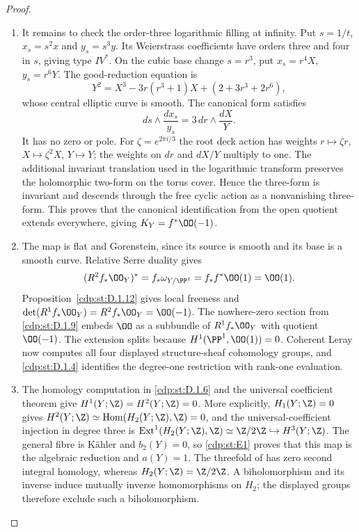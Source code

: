 \begin{proof}
\begin{enumerate}[label={$\langle1\rangle$\arabic*.},leftmargin=*]
\item It remains to check the order-three logarithmic filling at infinity.
Put $s=1/t$, $x_s=s^2x$ and $y_s=s^3y$. Its Weierstrass
coefficients have orders three and four in $s$, giving type $IV^*$.
On the cubic base change $s=r^3$, put
$x_s=r^4X$, $y_s=r^6Y$. The good-reduction equation is
\[
Y^2=X^3-3r(r^3+1)X+(2+3r^3+2r^6),
\]
whose central elliptic curve is smooth. The canonical form satisfies
\[
ds\wedge\frac{dx_s}{y_s}
=3\,dr\wedge\frac{dX}{Y}.
\]
It has no zero or pole. For $\zeta=e^{2\pi i/3}$ the root deck
action has weights $r\mapsto\zeta r$, $X\mapsto\zeta^2X$,
$Y\mapsto Y$; the weights on $dr$ and $dX/Y$ multiply to one.
The additional invariant translation used in the logarithmic
transform preserves the holomorphic two-form on the torus cover.
Hence the three-form is invariant and descends through the free
cyclic action as a nonvanishing three-form. This proves that the
canonical identification from the open quotient extends everywhere,
giving $K_Y=f^*\OO(-1)$.

\item The map is flat and Gorenstein, since its source is smooth and its
base is a smooth curve. Relative Serre duality gives
\[
(R^2f_*\OO_Y)^*=f_*\omega_{Y/\PP^1}
=f_*f^*\OO(1)=\OO(1).
\]
Proposition~\ref{cdp:st:D.1.12} gives local freeness and
$\det(R^1f_*\OO_Y)=R^2f_*\OO_Y=\OO(-1)$.
The nowhere-zero section from \ref{cdp:st:D.1.9} embeds $\OO$ as a subbundle
of $R^1f_*\OO_Y$ with quotient $\OO(-1)$. The extension splits
because $H^1(\PP^1,\OO(1))=0$. Coherent Leray now computes all
four displayed structure-sheaf cohomology groups, and \ref{cdp:st:D.1.4}
identifies the degree-one restriction with rank-one evaluation.

\item The homology computation in \ref{cdp:st:D.1.6} and the universal coefficient
theorem give $H^1(Y;\Z)=H^2(Y;\Z)=0$. More explicitly,
$H_1(Y;\Z)=0$ gives
$H^2(Y;\Z)\simeq\operatorname{Hom}(H_2(Y;\Z),\Z)=0$,
and the universal-coefficient injection in degree three is
$\operatorname{Ext}^1(H_2(Y;\Z),\Z)\simeq\Z/2\Z
\hookrightarrow H^3(Y;\Z)$.
The general fibre is K\"ahler and $b_2(Y)=0$, so \ref{cdp:st:E1} proves that
this map is the algebraic reduction and $a(Y)=1$.
The threefold of  has zero second
integral homology, whereas $H_2(Y;\Z)=\Z/2\Z$. A biholomorphism
and its inverse induce mutually inverse homomorphisms on $H_2$;
the displayed groups therefore exclude such a biholomorphism.

\end{enumerate}
\end{proof}